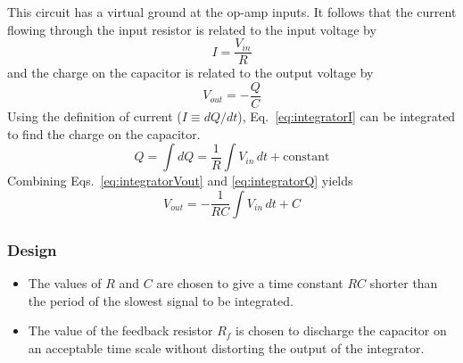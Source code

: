 \documentclass[11pt]{article}
\begin{document}
This circuit has a virtual ground at the op-amp inputs. It follows
that the current flowing through the input resistor is related to the
input voltage by
\begin{equation}
  \label{eq:integratorI}
  I = \frac{V_{in}}{R}
\end{equation}
and the charge on the capacitor is related to the output voltage by
\begin{equation}
  \label{eq:integratorVout}
  V_{out} = -\frac{Q}{C}
\end{equation}
Using the definition of current ($I \equiv dQ/dt$),
Eq.~\ref{eq:integratorI} can be integrated to find the charge on the
capacitor.
\begin{equation}
  \label{eq:integratorQ}
  Q = \int dQ = \frac{1}{R} \int V_{in} \, dt + \mathrm{constant}
\end{equation}
Combining Eqs.~\ref{eq:integratorVout} and \ref{eq:integratorQ} yields
\begin{equation}
  \label{eq:opampint}
  V_{out} = - \frac{1}{RC} \int V_{in} \, dt + C
\end{equation}

\subsubsection*{Design}
\begin{itemize}
\item The values of $R$ and $C$ are chosen to give a time constant
  $RC$ shorter than the period of the slowest signal to be integrated. 

\item The value of the feedback resistor $R_f$ is chosen to discharge
  the capacitor on an acceptable time scale without distorting the
  output of the integrator.
  
\end{itemize}


\end{document}
